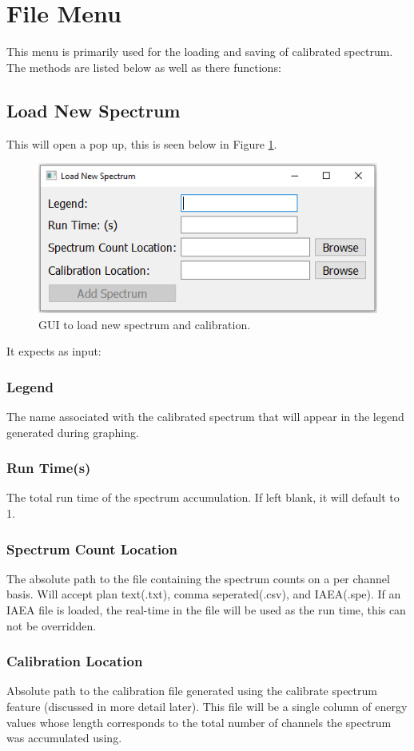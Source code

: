 \section{File Menu}
	This menu is primarily used for the loading and saving of calibrated spectrum. The methods are listed below as well as there functions:
		\subsection{Load New Spectrum}
			This will open a pop up, this is seen below in Figure \ref{fig:load_new}. \\
				\begin{figure}[h!]
					\centering
					\includegraphics[width=0.7\linewidth]{Load_New.png}
					\caption{GUI to load new spectrum and calibration.}
					\label{fig:load_new}
				\end{figure}
		It expects as input:
				\subsubsection{Legend} 
					The name associated with the calibrated spectrum that will appear in the legend generated during graphing.
				\subsubsection{Run Time(s)}
				 The total run time of the spectrum accumulation. If left blank, it will default to 1.
				\subsubsection{Spectrum Count Location}
				 The absolute path to the file containing the spectrum counts on a per channel basis. Will accept plan text(.txt), comma seperated(.csv), and IAEA(.spe). If an IAEA file is loaded, the real-time in the file will be used as the run time, this can not be overridden.
				\subsubsection{Calibration Location}
				 Absolute path to the calibration file generated using the calibrate spectrum feature (discussed in more detail later). This file will be a single column of energy values whose length corresponds to the total number of channels the spectrum was accumulated using. 

